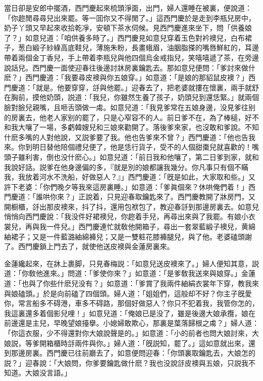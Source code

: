 當日卻是安郎中擺酒，西門慶起來梳頭淨面，出門，婦人還睡在被裏，便說道：「你趂閒尋尋兒出來罷。等一囬你又不得閒了。」這西門慶於是走到李瓶兒房中，奶子丫頭又早起來收拾乾凈，安頓下茶水伺候。見西門慶進來坐下，問「供養娘了？」如意兒道：「咱供養多時了。」西門慶見如意兒穿着玉色對衿襖兒，白布裙子，葱白緞子紗綠高底鞋兒，薄施朱粉，長畫蛾眉，油胭脂搽的嘴唇鮮紅的，耳邊帶着兩個金丁香兒，手上帶着李瓶兒與他四個烏金戒指兒，笑嘻嘻遞了茶，在旁邊說話兒。西門慶一面使迎春往後邊討牀房裏鑰匙去。那如意兒便問：「爹討來做什麽？」西門慶道：「我要尋皮襖與你五娘穿。」如意道：「是娘的那貂鼠皮襖？」西門慶道：「就是。他要穿穿，㧱與他罷。」迎春去了，把老婆就摟在懷裏，兩手就舒在胸前，摸他奶頭，説道：「我兒，你雖然生養了孩子，奶頭兒到還恁緊。」就兩個臉對臉兒親嘴，且咂舌頭做一䖏。如意兒道：「我見爹常在五娘身邊，没見爹往别的房裏去，他老人家别的罷了，只是心窄容不的人。前日爹不在，為了棒槌，好不和我大嚷了一場，多虧韓嫂兒和三娘來勸開了。落後爹來家，也沒敢和爹說。不知什麽多嘴的人對他說，又説爹要了我。他也告爹來不曾？」西門慶道：「他也告我來。你到明日替他陪個禮兒便了，他是恁行貨子，受不的人個甜棗兒就喜歡的！嘴頭子雖利害，倒也没什麽心。」如意兒道：「前日我和他嚷了，第二日爹到家，就和我說好話。説爹在他身邊偏的多，『就是別的娘都讓我幾分。你凡事只有個不瞞我，我放着河水不洗船，好做惡人？』」西門慶道：「旣是如此，大家取和些。」又許下老婆：「你們晚夕等我來這房裏睡。」如意道：「爹眞個來？休哄俺們着！」西門慶道：「誰哄你來？」正說着，只見迎春取鑰匙來了。西門慶教開了牀房門，又開橱櫃，㧱出那皮襖來，抖了抖，還用包袱包了，教迎春㧱到那邊房裏去。如意兒悄悄向西門慶說：「我没件好裙襖兒，你趂着手兒，再尋出來與了我罷。有娘小衣裳兒，再與我一件兒。」西門慶連忙就敎他開箱子，尋出一套翠藍緞子襖兒，黄綿紬裙子；又是一件藍潞紬綿褲兒；又是一雙粧花膝褲腿兒，與了他。老婆磕頭謝了。西門慶鎖上門去了，就使他送皮襖與金蓮房裏來。

金蓮纔起來，在牀上裹脚，只見春梅説：「如意兒送皮襖來了。」婦人便知其意，説道：「你敎他進來。」問道：「爹使你來？」如意道：「是爹敎我送來與娘穿。」金蓮道：「也與了你些什麽兒没有？」如意道：「爹賞了我兩件紬絹衣裳年下穿，教我來與娘磕頭。」於是向前磕了四個頭。婦人道：「姐姐們，這般却不好？你主子旣愛你，常言船多不碍港，車多不碍路，那個好做惡人？你只不犯着我，我管你怎的，我這裏還多着個影兒哩！」如意兒道：「俺娘已是没了，雖是後邊大娘承攬，娘在前邊還是主兒，早晚望娘擡擧。小媳婦敢欺心，那裏是葉落歸根之䖏？」婦人道：「你這衣服，少不得還對你大娘說聲是的。」如意道：「小的前者也問大娘討來，大娘説，等爹開箱櫃時㧱兩件與你。」婦人道：「旣説知，罷了。」這如意就出來，還到那邊房裏。西門慶已往前廳去了，如意便問迎春：「你頭裏取鑰匙去，大娘怎的説？」迎春說：「大娘問，你爹要鑰匙做什麽？我也没說㧱皮襖與五娘，只説我不知道。大娘没言語。」

